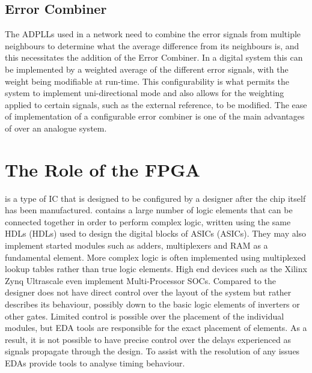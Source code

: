 \subsection{Error Combiner}
The \acp{ADPLL} used in a network need to combine the error signals from multiple neighbours to determine what the average difference from its neighbours is, and this necessitates the addition of the Error Combiner. In a digital system this can be implemented by a weighted average of the different error signals, with the weight being modifiable at run-time. This configurability is what permits the system to implement uni-directional mode and also allows for the weighting applied to certain signals, such as the external reference, to be modified. The ease of implementation of a configurable error combiner is one of the main advantages of  over an analogue system.

\section{The Role of the FPGA}
 is a type of \ac{IC} that is designed to be configured by a designer after the chip itself has been manufactured.  contains a large number of logic elements that can be connected together in order to perform complex logic, written using the same \aclp{HDL} (\acsp{HDL}) used to design the digital blocks of \aclp{ASIC} (\acsp{ASIC}). They may also implement started modules such as adders, multiplexers and \ac{RAM} as a fundamental element. More complex logic is often implemented using multiplexed lookup tables rather than true logic elements. High end devices such as the Xilinx Zynq Ultrascale even implement Multi-Processor \ac{SOC}s. Compared to  the designer does not have direct control over the layout of the system but rather describes its behaviour, possibly down to the basic logic elements of inverters or other gates. Limited control is possible over the placement of the individual modules, but \ac{EDA} tools are responsible for the exact placement of elements. As a result, it is not possible to have precise control over the delays experienced as signals propagate through the design. To assist with the resolution of any issues \ac{EDA}s provide tools to analyse timing behaviour.

